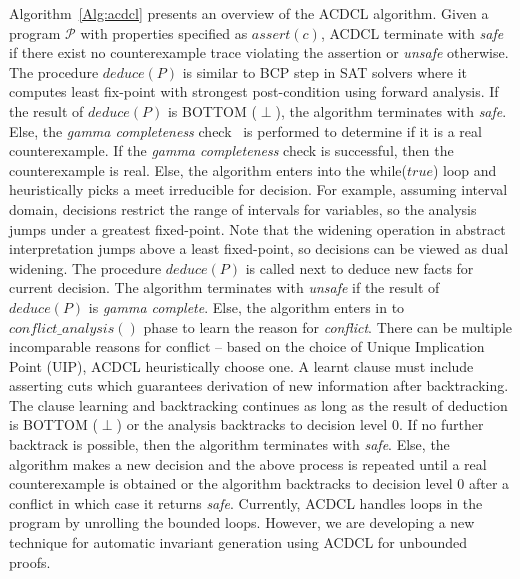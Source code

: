Algorithm~\ref{Alg:acdcl} presents an overview of the ACDCL algorithm.
Given a program $\mathcal{P}$ with properties specified as $assert(c)$,
ACDCL terminate with {\em safe} if there exist no counterexample trace violating the 
assertion or {\em unsafe} otherwise. The procedure $deduce(P)$ is similar 
to BCP step in SAT solvers where it computes least fix-point with 
strongest post-condition using forward analysis. If the result of $deduce(P)$ 
is BOTTOM ($\perp$), the algorithm terminates with {\em safe}. Else, the 
{\em gamma completeness} check~\cite{sas01} is performed to determine if it is a 
real counterexample. If the {\em gamma completeness} check is successful, then the 
counterexample is real. Else, the algorithm enters into the while($true$)
loop and heuristically picks a meet irreducible for decision. For example, assuming 
interval domain, decisions restrict the range of intervals for variables, so the analysis jumps under a 
greatest fixed-point. Note that the widening operation in abstract interpretation 
jumps above a least fixed-point, so decisions can be viewed as 
dual widening. The procedure $deduce(P)$ is called next to deduce new facts for 
current decision. The algorithm terminates with {\em unsafe} if the result of $deduce(P)$ 
is {\em gamma complete}. Else, the algorithm enters in to $conflict\_analysis()$ phase to learn 
the reason for {\em conflict}. There can be multiple incomparable reasons for conflict --
based on the choice of Unique Implication Point (UIP), ACDCL heuristically choose one. 
A learnt clause must include asserting cuts which guarantees
derivation of new information after backtracking. The clause learning and backtracking continues 
as long as the result of deduction is BOTTOM ($\perp$) or the 
analysis backtracks to decision level 0. If no further backtrack is possible, then the 
algorithm terminates with {\em safe}. Else, the algorithm makes a new decision and 
the above process is repeated until a real counterexample is obtained or the algorithm 
backtracks to decision level 0 after a conflict in which case it returns {\em safe}. 
Currently, ACDCL handles loops in the program by unrolling the bounded loops. 
However, we are developing a new technique for automatic invariant generation using 
ACDCL for unbounded proofs. 
